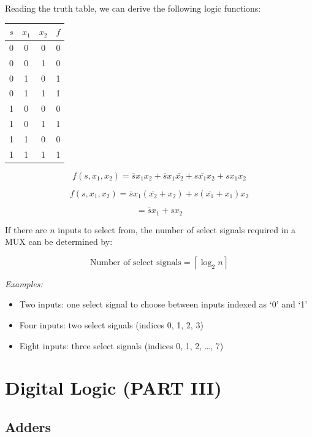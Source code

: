 \documentclass[12pt,openany, tikz,border=10pt]{book}
\begin{document}
Reading the truth table, we can derive the following logic functions:
\begin{table}[h!]
    \centering
    \begin{tabular}{cccc}
      \hline
      $s$ & $x_1$ & $x_2$ & $f$ \\
      \hline
      0 & 0 & 0 & 0 \\
      0 & 0 & 1 & 0 \\
      0 & 1 & 0 & 1 \\
      0 & 1 & 1 & 1 \\
      1 & 0 & 0 & 0 \\
      1 & 0 & 1 & 1 \\
      1 & 1 & 0 & 0 \\
      1 & 1 & 1 & 1 \\
      \hline
    \end{tabular}
  \end{table}
\[
f(s, x_1, x_2) = \overline{s} x_1 x_2 + \overline{s} x_1 \overline{x_2} + s \overline{x_1} x_2 + s x_1 x_2
\]

\[
f(s, x_1, x_2) = \overline{s}x_1 (\overline{x_2} + x_2) + s(\overline{x_1} + x_1)x_2
\]

\[
= \overline{s}x_1 + sx_2
\]



If there are \( n \) inputs to select from, the number of select signals required in a MUX can be determined by:

\[
\text{Number of select signals} = \left\lceil \log_2 n \right\rceil
\]

\textit{Examples:}
\begin{itemize}
    \item[] Two inputs: one select signal to choose between inputs indexed as `0' and `1'
    \item[] Four inputs: two select signals (indices 0, 1, 2, 3)
    \item[] Eight inputs: three select signals (indices 0, 1, 2, \ldots, 7)
\end{itemize}



\chapter{Digital Logic (PART III)}
\section{Adders}
\end{document}
